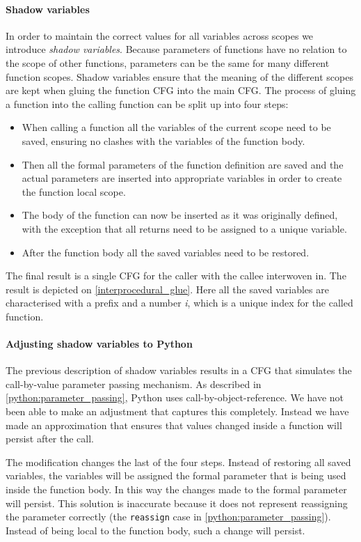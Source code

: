 \paragraph{Shadow variables}
In order to maintain the correct values for all variables across scopes we introduce \emph{shadow variables}.
Because parameters of functions have no relation to the scope of other functions, parameters can be the same for many different function scopes.
Shadow variables ensure that the meaning of the different scopes are kept when gluing the function CFG into the main CFG.
The process of gluing a function into the calling function can be split up into four steps:
\begin{itemize}
\item When calling a function all the variables of the current scope need to be saved, ensuring no clashes with the variables of the function body.
\item Then all the formal parameters of the function definition are saved and the actual parameters are inserted into appropriate variables in order to create the function local scope.
\item The body of the function can now be inserted as it was originally defined, with the exception that all returns need to be assigned to a unique variable.
\item After the function body all the saved variables need to be restored.
\end{itemize}

The final result is a single CFG for the caller with the callee interwoven in.
The result is depicted on \cref{interprocedural_glue}.
Here all the saved variables are characterised with a prefix and a number \emph{i}, which is a unique index for the called function.

\paragraph{Adjusting shadow variables to Python}
The previous description of shadow variables results in a CFG that simulates the call-by-value parameter passing mechanism.
As described in \cref{python:parameter_passing}, Python uses call-by-object-reference.
We have not been able to make an adjustment that captures this completely.
Instead we have made an approximation that ensures that values changed inside a function will persist after the call.

The modification changes the last of the four steps.
Instead of restoring all saved variables, the variables will be assigned the formal parameter that is being used inside the function body.
In this way the changes made to the formal parameter will persist.
This solution is inaccurate because it does not represent reassigning the parameter correctly (the \texttt{reassign} case in \cref{python:parameter_passing}).
Instead of being local to the function body, such a change will persist.

